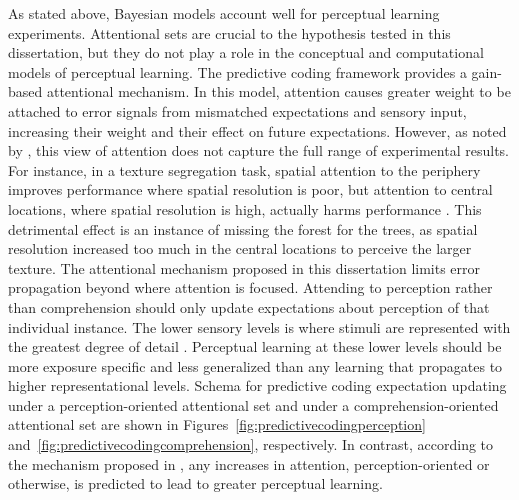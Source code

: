 As stated above, Bayesian models account well for perceptual learning experiments.
Attentional sets are crucial to the hypothesis tested in this dissertation, but they do not play a role in the conceptual and computational models of perceptual learning.
The predictive coding framework \citep{Clark2013} provides a gain-based attentional mechanism. 
In this model, attention causes greater weight to be attached to error signals from mismatched expectations and sensory input, increasing their weight and their effect on future expectations.  
However, as noted by \citet{Block2013}, this view of attention does not capture the full range of experimental results.  
For instance, in a texture segregation task, spatial attention to the periphery improves performance where spatial resolution is poor, but attention to central locations, where spatial resolution is high, actually harms performance \citep{Yeshurun1998}.  
This detrimental effect is an instance of missing the forest for the trees, as spatial resolution increased too much in the central locations to perceive the larger texture.  
The attentional mechanism proposed in this dissertation limits error propagation beyond where attention is focused.
Attending to perception rather than comprehension should only update expectations about perception of that individual instance.
The lower sensory levels is where stimuli are represented with the greatest degree of detail \citep{Gilbert2001}.
Perceptual learning at these lower levels should be more exposure specific and less generalized than any learning that propagates to higher representational levels.
Schema for predictive coding expectation updating under a perception-oriented attentional set and under a comprehension-oriented attentional set are shown in Figures~\ref{fig:predictivecodingperception} and~\ref{fig:predictivecodingcomprehension}, respectively.
In contrast, according to the mechanism proposed in \citet{Clark2013}, any increases in attention, perception-oriented or otherwise, is predicted to lead to greater perceptual learning.


